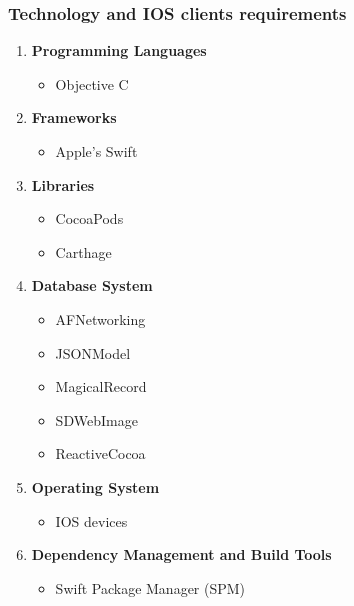 \documentclass[a4paper,10pt]{article}
\begin{document}
\subsubsection{Technology and IOS clients requirements}
\begin{enumerate}
 \item \textbf{Programming Languages}
	\begin{itemize}
		\item Objective C
	\end{itemize}
\item \textbf{Frameworks}
	\begin{itemize}
		\item Apple's Swift
	\end{itemize}
\item \textbf{Libraries}
	\begin{itemize}
		\item CocoaPods
		\item Carthage
	\end{itemize}
\item \textbf{Database System}
	\begin{itemize}
 		\item AFNetworking
		\item JSONModel
		\item MagicalRecord
		\item SDWebImage
		\item ReactiveCocoa
	\end{itemize}
\item \textbf{Operating System}
	\begin{itemize}
 		\item IOS devices
	\end{itemize}
\item \textbf{Dependency Management and Build Tools}
	\begin{itemize}
		\item Swift Package Manager (SPM)
	\end{itemize}
\end{enumerate}
\end{document}
